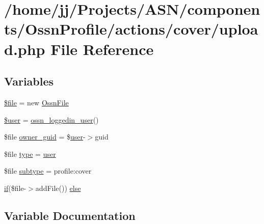 \hypertarget{_ossn_profile_2actions_2cover_2upload_8php}{}\section{/home/jj/\+Projects/\+A\+S\+N/components/\+Ossn\+Profile/actions/cover/upload.php File Reference}
\label{_ossn_profile_2actions_2cover_2upload_8php}
\subsection*{Variables}
\begin{DoxyCompactItemize}
\item 
\hyperlink{_ossn_profile_2actions_2cover_2upload_8php_aa1bfbd27060176201b271918dff57e8f}{\$file} = new \hyperlink{class_ossn_file}{Ossn\+File}
\item 
\hyperlink{_ossn_profile_2actions_2cover_2upload_8php_a598ca4e71b15a1313ec95f0df1027ca5}{\$user} = \hyperlink{ossn_8lib_8users_8php_aa3c8068d0e6638b414d6a2f6c62565b8}{ossn\+\_\+loggedin\+\_\+user}()
\item 
\$file \hyperlink{_ossn_profile_2actions_2cover_2upload_8php_ae1eac7270110a6c219e7f3f2006b013d}{owner\+\_\+guid} = \$\hyperlink{ossn_8config_8db_8example_8php_a802544b7ba9f79bbf24ef67773d53bed}{user}-\/$>$guid
\item 
\$file \hyperlink{_ossn_profile_2actions_2cover_2upload_8php_a527a7724584d0c97b2c0831f61045ce4}{type} = \textquotesingle{}\hyperlink{ossn_8config_8db_8example_8php_a802544b7ba9f79bbf24ef67773d53bed}{user}\textquotesingle{}
\item 
\$file \hyperlink{_ossn_profile_2actions_2cover_2upload_8php_a9a9adf8ceba16f25c922504134349f22}{subtype} = \textquotesingle{}profile\+:cover\textquotesingle{}
\item 
\hyperlink{jquery_8tokeninput_8js_ad8dd46a3cbc004569e34401e9e71771a}{if}(\$file-\/$>$add\+File()) \hyperlink{_ossn_profile_2actions_2cover_2upload_8php_a1f26f347b71818b9b83518e7c73da3a1}{else}
\end{DoxyCompactItemize}


\subsection{Variable Documentation}
